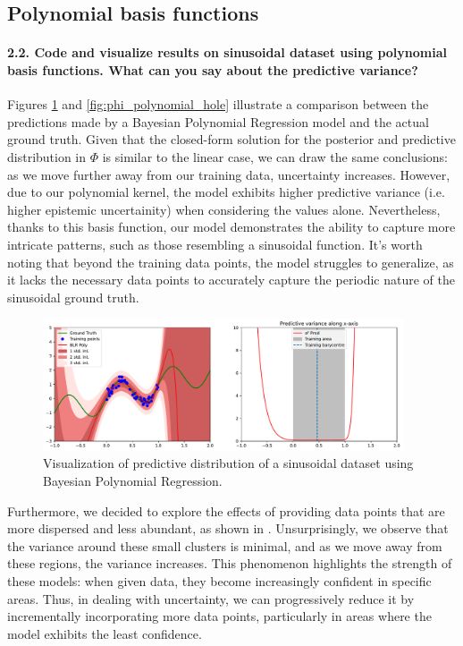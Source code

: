 \subsection{Polynomial basis functions}

\paragraph*{2.2. Code and visualize results on sinusoidal dataset using polynomial basis functions. What can you say about the predictive variance?}

Figures \ref{fig:phi_polynomial} and \ref{fig:phi_polynomial_hole} illustrate a comparison between the predictions made by a Bayesian Polynomial Regression model and the actual ground truth. Given that the closed-form solution for the posterior and predictive distribution in $\Phi$ is similar to the linear case, we can draw the same conclusions: as we move further away from our training data, uncertainty increases. However, due to our polynomial kernel, the model exhibits higher predictive variance (i.e. higher epistemic uncertainity) when considering the values alone. Nevertheless, thanks to this basis function, our model demonstrates the ability to capture more intricate patterns, such as those resembling a sinusoidal function. It's worth noting that beyond the training data points, the model struggles to generalize, as it lacks the necessary data points to accurately capture the periodic nature of the sinusoidal ground truth. %

\begin{figure}[H]
    \centering
    \includegraphics[width=0.95\textwidth]{phi_polynomial.pdf}
    \caption{Visualization of predictive distribution of a sinusoidal dataset using Bayesian Polynomial Regression.}
    \label{fig:phi_polynomial}
\end{figure}

Furthermore, we decided to explore the effects of providing data points that are more dispersed and less abundant, as shown in . Unsurprisingly, we observe that the variance around these small clusters is minimal, and as we move away from these regions, the variance increases. This phenomenon highlights the strength of these models: when given data, they become increasingly confident in specific areas. Thus, in dealing with uncertainty, we can progressively reduce it by incrementally incorporating more data points, particularly in areas where the model exhibits the least confidence.

